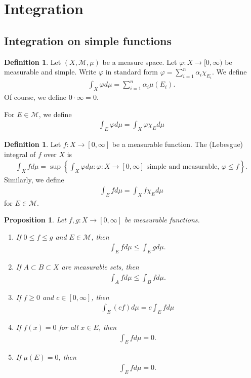 \documentclass[11pt]{amsart}
\newtheorem{proposition}[theorem]{Proposition}
\theoremstyle{definition}
\newtheorem{definition}[theorem]{Definition}
\numberwithin{equation}{section}
\begin{document}
\section{Integration}
\subsection{Integration on simple functions}
\begin{definition}
    Let $(X,\mathcal M,\mu)$ be a measure space. Let $\varphi:X\to[0,\infty)$ be measurable and simple. Write $\varphi$ in standard form $\varphi=\sum_{i=1}^n\alpha_i\chi_{E_i}$. We define
    \begin{align*}
        \int_X\varphi d\mu=\sum_{i=1}^n\alpha_i\mu(E_i).
    \end{align*}
    Of course, we define $0\cdot \infty=0$.

    For $E\in\mathcal M$, we define 
    \begin{align*}
        \int_E\varphi d\mu=\int_X\varphi\chi_E d\mu
    \end{align*}
\end{definition}
\begin{definition}
    Let $f:X\to[0,\infty]$ be a measurable function. The (Lebesgue) integral of $f$ over $X$ is
    \begin{align*}
        \int_Xfd\mu=\sup\left\{\int_X\varphi d\mu:\varphi:X\to[0,\infty]\text{ simple and measurable, }\varphi\le f\right\}.
    \end{align*}
    Similarly, we define 
    \begin{align*}
        \int_Ef d\mu=\int_X f\chi_E d\mu
    \end{align*}
    for $E\in\mathcal M$.
\end{definition}
\begin{proposition}
    Let $f,g:X\to[0,\infty]$ be measurable functions.
    \begin{enumerate}
        \item [(a)] If $0\le f\le g$ and $E\in\mathcal M$, then
        \begin{align*}
            \int_Ef d\mu\le\int_E gd\mu.
        \end{align*}
        \item [(b)] If $A\subset B\subset X$ are measurable sets, then
        \begin{align*}
            \int_Afd\mu\le\int_Bfd\mu.
        \end{align*}
        \item [(c)] If $f\ge0$ and $c\in[0,\infty]$, then 
        \begin{align*}
            \int_E(cf)d\mu=c\int_Ef d\mu
        \end{align*}
        \item [(d)] If $f(x)= 0$ for all $x\in E$, then 
        \begin{align*}
            \int_Efd\mu=0.
        \end{align*}
        \item [(e)] If $\mu(E)=0$, then 
        \begin{align*}
            \int_Efd\mu=0.
        \end{align*}
    \end{enumerate}
\end{proposition}
\end{document}
